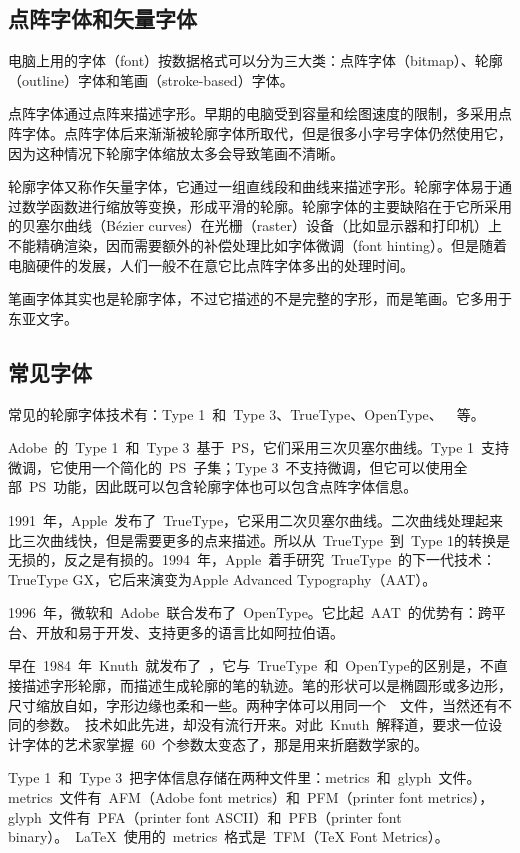 \subsection{点阵字体和矢量字体}
电脑上用的字体（font）按数据格式可以分为三大类：点阵字体（bitmap）、轮廓（outline）字体和笔画（stroke-based）字体。

点阵字体通过点阵来描述字形。早期的电脑受到容量和绘图速度的限制，多采用点阵字体。点阵字体后来渐渐被轮廓字体所取代，但是很多小字号字体仍然使用它，因为这种情况下轮廓字体缩放太多会导致笔画不清晰。

轮廓字体又称作矢量字体，它通过一组直线段和曲线来描述字形。轮廓字体易于通过数学函数进行缩放等变换，形成平滑的轮廓。轮廓字体的主要缺陷在于它所采用的贝塞尔曲线（Bézier curves）在光栅（raster）设备（比如显示器和打印机）上不能精确渲染，因而需要额外的补偿处理比如字体微调（font hinting）。但是随着电脑硬件的发展，人们一般不在意它比点阵字体多出的处理时间。

笔画字体其实也是轮廓字体，不过它描述的不是完整的字形，而是笔画。它多用于东亚文字。

\subsection{常见字体}

常见的轮廓字体技术有：Type 1~和~Type 3、TrueType、OpenType、~\MF~等。

Adobe~的~Type 1~和~Type 3~基于~PS，它们采用三次贝塞尔曲线。Type 1~支持微调，它使用一个简化的~PS~子集；Type 3~不支持微调，但它可以使用全部~PS~功能，因此既可以包含轮廓字体也可以包含点阵字体信息。
    
1991~年，Apple~发布了~TrueType，它采用二次贝塞尔曲线。二次曲线处理起来比三次曲线快，但是需要更多的点来描述。所以从~TrueType~到~Type 1的转换是无损的，反之是有损的。1994~年，Apple~着手研究~TrueType~的下一代技术：TrueType GX，它后来演变为Apple Advanced Typography（AAT）。

1996~年，微软和~Adobe~联合发布了~OpenType。它比起~AAT~的优势有：跨平台、开放和易于开发、支持更多的语言比如阿拉伯语。

早在~1984~年~Knuth~就发布了~\MF，它与~TrueType~和~OpenType的区别是，不直接描述字形轮廓，而描述生成轮廓的笔的轨迹。笔的形状可以是椭圆形或多边形，尺寸缩放自如，字形边缘也柔和一些。两种字体可以用同一个~\MF~文件，当然还有不同的参数。\MF~技术如此先进，却没有流行开来。对此~Knuth~解释道，要求一位设计字体的艺术家掌握~60~个参数太变态了，那是用来折磨数学家的。

Type 1~和~Type
3~把字体信息存储在两种文件里：metrics~和~glyph~文件。metrics~文件有~AFM（Adobe font metrics）和~PFM（printer font metrics），glyph~文件有~PFA（printer font ASCII）和~PFB（printer font binary）。~\LaTeX{}~使用的~metrics~格式是~TFM（TeX Font Metrics）。

